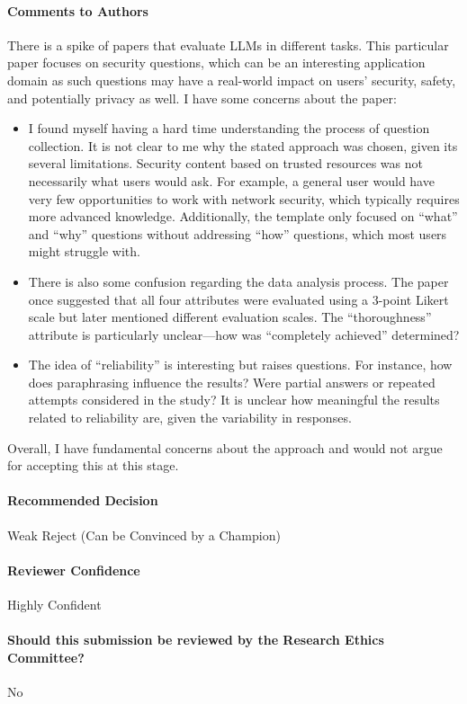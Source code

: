 \documentclass[letterpaper,twocolumn,10pt]{article}
\begin{document}
\paragraph{Comments to Authors}
There is a spike of papers that evaluate LLMs in different tasks. This particular paper focuses on security questions, which can be an interesting application domain as such questions may have a real-world impact on users’ security, safety, and potentially privacy as well. I have some concerns about the paper:
\begin{itemize}
    \item I found myself having a hard time understanding the process of question collection. It is not clear to me why the stated approach was chosen, given its several limitations. Security content based on trusted resources was not necessarily what users would ask. For example, a general user would have very few opportunities to work with network security, which typically requires more advanced knowledge. Additionally, the template only focused on “what” and “why” questions without addressing “how” questions, which most users might struggle with.
    \item There is also some confusion regarding the data analysis process. The paper once suggested that all four attributes were evaluated using a 3-point Likert scale but later mentioned different evaluation scales. The “thoroughness” attribute is particularly unclear—how was “completely achieved” determined?
    \item The idea of “reliability” is interesting but raises questions. For instance, how does paraphrasing influence the results? Were partial answers or repeated attempts considered in the study? It is unclear how meaningful the results related to reliability are, given the variability in responses.
\end{itemize}
Overall, I have fundamental concerns about the approach and would not argue for accepting this at this stage.

\paragraph{Recommended Decision}
Weak Reject (Can be Convinced by a Champion)

\paragraph{Reviewer Confidence}
Highly Confident

\paragraph{Should this submission be reviewed by the Research Ethics Committee?}
No
\end{document}

